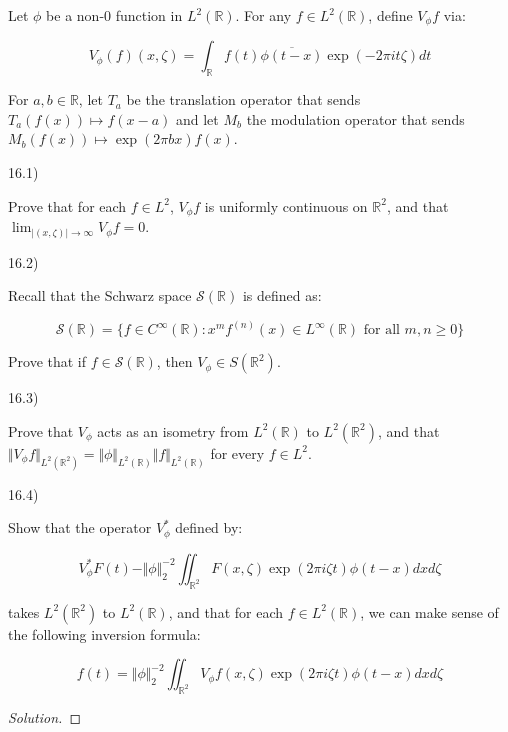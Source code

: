 \documentclass[10pt]{article}
\newenvironment{problem}[2][]{\begin{trivlist}
\item[\hskip \labelsep {\bfseries #1}\hskip \labelsep {\bfseries #2.}]}{\end{trivlist}}
\begin{document}
\begin{problem}{Question 16}

Let $\phi$ be a non-0 function in $L^2(\mathbb{R})$. For any $f \in L^2(\mathbb{R})$, define $V_\phi f$ via:

$$ V_\phi(f)(x, \zeta) = \int_{\mathbb{R}} f(t) \overline{\phi(t-x)} \exp(-2 \pi i t \zeta) dt $$

For $a, b \in \mathbb{R}$, let $T_a$ be the translation operator that sends $T_a(f(x)) \mapsto f(x -a )$ and let $M_b$ the modulation operator that sends $M_b(f(x)) \mapsto \exp(2 \pi bx)f(x)$.

16.1)

Prove that for each $f\in L^2$, $V_\phi f$ is uniformly continuous on $\mathbb{R}^2$, and that $\lim_{|(x, \zeta)| \to \infty} V_\phi f = 0$.

16.2)

Recall that the Schwarz space $\mathcal{S}(\mathbb{R})$ is defined as:

$$ \mathcal{S}(\mathbb{R}) = \{ f \in C^\infty(\mathbb{R}) : x^m f^{(n)}(x) \in L^\infty(\mathbb{R}) \text{ for all } m, n \geq 0 \}$$

Prove that if $f \in \mathcal{S}(\mathbb{R})$, then $V_\phi \in S(\mathbb{R}^2)$.

16.3)

Prove that $V_\phi$ acts as an isometry from $L^2(\mathbb{R})$ to $L^2(\mathbb{R}^2)$, and that $\Vert V_\phi f \Vert_{L^2(\mathbb{R}^2)} = \Vert \phi \Vert_{L^2(\mathbb{R})} \Vert f \Vert_{L^2(\mathbb{R})}$ for every $f \in L^2$.

16.4)

Show that the operator $V_\phi^*$ defined by:

$$ V_\phi^* F(t) - \Vert \phi\Vert_2^{-2} \iint_{\mathbb{R}^2} F(x, \zeta) \exp(2\pi i \zeta t) \phi(t - x) dx d\zeta $$

takes $L^2(\mathbb{R}^2)$ to $L^2(\mathbb{R})$, and that for each $f \in L^2(\mathbb{R})$, we can make sense of the following inversion formula:

$$ f(t) = \Vert \phi \Vert_2^{-2} \iint_{\mathbb{R}^2} V_\phi f(x, \zeta) \exp(2 \pi i \zeta t) \phi(t - x) dx d\zeta $$

\end{problem}

\begin{proof}[Solution]

\end{proof}
\end{document}
